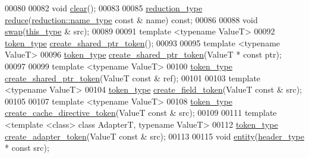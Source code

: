\begin{DoxyCode}
00080 
00082     \textcolor{keywordtype}{void} \hyperlink{classhryky_1_1http_1_1header_1_1_parser_a274efb7f946d3718efbfbc154750c278}{clear}();
00083 
00085     \hyperlink{classhryky_1_1_intrusive_ptr}{reduction_type} \hyperlink{classhryky_1_1http_1_1header_1_1_parser_a4ac02c5b2de84a6e8130148dc6064bb8}{reduce}(\hyperlink{classhryky_1_1reduction_1_1_string}{reduction::name_type} \textcolor{keyword}{const} & name) \textcolor{keyword}{const};
00086 
00088     \textcolor{keywordtype}{void} \hyperlink{classhryky_1_1http_1_1header_1_1_parser_a827667b5e98feeb979ec0b2e3b04f54f}{swap}(\hyperlink{classhryky_1_1http_1_1header_1_1_parser}{this_type} & src);
00089 
00091     \textcolor{keyword}{template} <\textcolor{keyword}{typename} ValueT>
00092     \hyperlink{classhryky_1_1_vector}{token_type} \hyperlink{classhryky_1_1http_1_1header_1_1_parser_a0593e9a0e2cd945d715cfbaf0a3f2fdb}{create_shared_ptr_token}();
00093 
00095     \textcolor{keyword}{template} <\textcolor{keyword}{typename} ValueT>
00096     \hyperlink{classhryky_1_1_vector}{token_type} \hyperlink{classhryky_1_1http_1_1header_1_1_parser_a0593e9a0e2cd945d715cfbaf0a3f2fdb}{create_shared_ptr_token}(ValueT * \textcolor{keyword}{const} ptr);
00097 
00099     \textcolor{keyword}{template} <\textcolor{keyword}{typename} ValueT>
00100     \hyperlink{classhryky_1_1_vector}{token_type} \hyperlink{classhryky_1_1http_1_1header_1_1_parser_a0593e9a0e2cd945d715cfbaf0a3f2fdb}{create_shared_ptr_token}(ValueT \textcolor{keyword}{const} & ref);
00101 
00103     \textcolor{keyword}{template} <\textcolor{keyword}{typename} ValueT>
00104     \hyperlink{classhryky_1_1_vector}{token_type} \hyperlink{classhryky_1_1http_1_1header_1_1_parser_a1c184592556a67601aa3d6195a746dfb}{create_field_token}(ValueT \textcolor{keyword}{const} & src);
00105 
00107     \textcolor{keyword}{template} <\textcolor{keyword}{typename} ValueT>
00108     \hyperlink{classhryky_1_1_vector}{token_type} \hyperlink{classhryky_1_1http_1_1header_1_1_parser_ab563791ae22360bf7490fceb952d7601}{create_cache_directive_token}(ValueT \textcolor{keyword}{const} & src);
00109 
00111     \textcolor{keyword}{template} <\textcolor{keyword}{template} <\textcolor{keyword}{class}> \textcolor{keyword}{class }AdapterT, \textcolor{keyword}{typename} ValueT>
00112     \hyperlink{classhryky_1_1_vector}{token_type} \hyperlink{classhryky_1_1http_1_1header_1_1_parser_a131ffc5be65b0aafa64241c87de5facd}{create_adapter_token}(ValueT \textcolor{keyword}{const} & src);
00113 
00115     \textcolor{keywordtype}{void} \hyperlink{classhryky_1_1http_1_1header_1_1_parser_a141af3e67b7df44941b5cf2536ecce6b}{entity}(\hyperlink{classhryky_1_1http_1_1header_1_1_entity}{header_type} * \textcolor{keyword}{const} src);

\end{DoxyCode}
